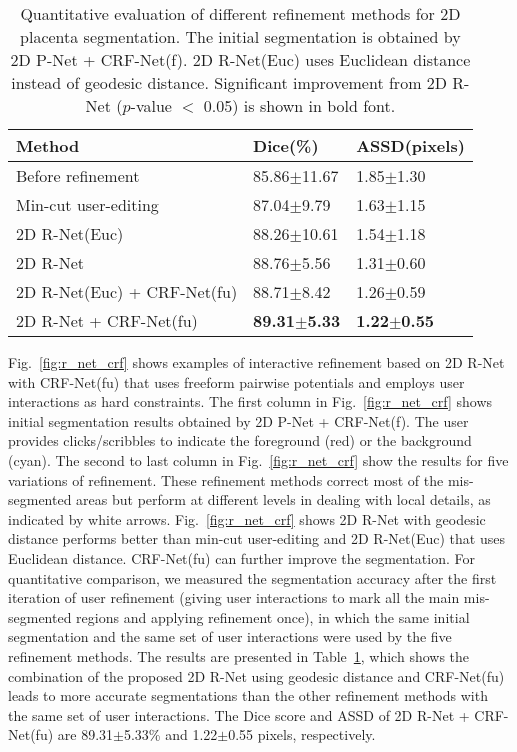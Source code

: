\documentclass[10pt,journal,compsoc]{IEEEtran}
\begin{document}
\begin{table}
	\centering
	\small
	\caption{Quantitative evaluation of different refinement methods for 2D placenta segmentation. The initial segmentation is obtained by 2D P-Net + CRF-Net(f). 2D R-Net(Euc) uses Euclidean distance instead of geodesic distance. Significant improvement from 2D R-Net ($p$-value $<$ 0.05) is shown in bold font.}
	\label{lab:r-net_crf_dice}
	\begin{tabular}{lll}
		\hline
		Method & Dice(\%) & ASSD(pixels) \\ \hline
		Before refinement & 85.86$\pm$11.67 & 1.85$\pm$1.30 \\
		Min-cut user-editing & 87.04$\pm$9.79 & 1.63$\pm$1.15 \\
		2D R-Net(Euc)       & 88.26$\pm$10.61 & 1.54$\pm$1.18 \\ 
		
		2D R-Net       & 88.76$\pm$5.56  & 1.31$\pm$0.60 \\
		2D R-Net(Euc) + CRF-Net(fu) & 88.71$\pm$8.42  & 1.26$\pm$0.59 \\
		2D R-Net + CRF-Net(fu)  & \textbf{89.31$\pm$5.33}  & \textbf{1.22$\pm$0.55} \\  
		 \hline
	\end{tabular}
\end{table}
Fig.~\ref{fig:r_net_crf} shows examples of interactive refinement based on 2D R-Net with CRF-Net(fu) that uses freeform pairwise potentials and employs user interactions as hard constraints. The first column in Fig.~\ref{fig:r_net_crf} shows initial segmentation results obtained by 2D P-Net + CRF-Net(f). The user provides clicks/scribbles to indicate the foreground (red) or the background (cyan). %
The second to last column in Fig.~\ref{fig:r_net_crf} show the results for five variations of refinement. %
These refinement methods correct most of the mis-segmented areas but perform at different levels in dealing with local details, as indicated by white arrows. Fig.~\ref{fig:r_net_crf} shows 2D R-Net with geodesic distance performs better than min-cut user-editing and 2D R-Net(Euc) that uses Euclidean distance. CRF-Net(fu) can further improve the segmentation. For quantitative comparison, we measured the segmentation accuracy after the first iteration of user refinement (giving user interactions to mark all the main mis-segmented regions and applying refinement once), in which the same initial segmentation and the same set of user interactions were used by the five refinement methods. The results are presented in Table~\ref{lab:r-net_crf_dice}, which shows the combination of the proposed 2D R-Net using geodesic distance and CRF-Net(fu) leads to more accurate segmentations than the other refinement methods with the same set of user interactions. The Dice score and ASSD of 2D R-Net +  CRF-Net(fu) are 89.31$\pm$5.33\% and 1.22$\pm$0.55 pixels, respectively. 
\end{document}
